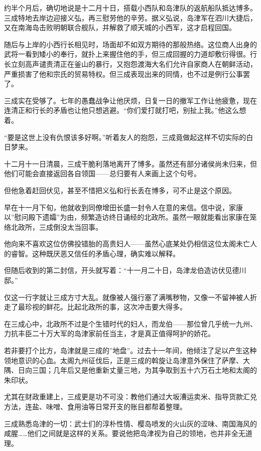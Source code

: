 \documentclass[
]{book}
\begin{document}
约半个月后，确切地说是十二月十日，搭载小西队和岛津队的返航船队抵达博多。三成特地去岸边迎接义弘，再三慰劳他的辛劳。据义弘说，岛津军在泗川大捷后，又在南海岛击败明朝联合舰队，并解救了顺天城的小西军，这才启程回国。

随后与上岸的小西行长相见时，场面却不如双方期待的那般热络。这位商人出身的武将一看到矮小的奉行，就扑上来握住他的手，但三成回握的力道却敷衍得很。行长立刻高声谴责清正在釜山的暴行，又抱怨渡海大名们允许自家商人在朝鲜活动，严重损害了他和宗氏的贸易特权。但三成表现出来的同情，也不过是例行公事罢了。

三成实在受够了。七年的愚蠢战争让他厌烦，日复一日的撤军工作让他疲惫，现在连清正和行长的矛盾也让他只想逃避。``你们爱打就打吧，别扯上我。''他这么想着。

``要是这世上没有仇恨该多好啊。''听着友人的抱怨，三成竟做起这样不切实际的白日梦来。

十二月十一日清晨，三成干脆利落地离开了博多。虽然还有部分诸侯尚未归来，但他们可能会直接返回各自领国------总归要有人来画上这个句号。

但他急着赶回伏见，甚至不惜把义弘和行长丢在博多，可不止是这个原因。

早在十一月下旬，他就收到同僚增田长盛一封令人在意的来信。信中说，家康以''慰问殿下遗孀''为由，频繁造访终日诵经的北政所。虽然一眼就能看出家康在笼络北政所，三成倒没太当回事。

他向来不喜欢这位仿佛投错胎的高贵妇人------虽然心底某处仍相信这位太阁未亡人的睿智。这种既厌恶又信任的矛盾心理，确实难以解释。

但随后收到的第二封信，开头就写着：``十一月二十日，岛津龙伯造访伏见德川邸。''

仅这一行字就让三成方寸大乱。就像被人强行塞了满嘴秽物，又像一不留神被人折走了最珍视的鲜花。比起北政所的事，这次冲击要大得多。

在三成心中，北政所不过是个生错时代的妇人，而龙伯------那位曾几乎统一九州、力抗丰臣二十万大军的岛津家前任当主，才是真正值得呵护的娇花。

若非要打个比方，岛津就是三成的''地盘''。过去十一年间，他倾注了足以产生这种领地意识的心血。太阁九州征伐后，正是三成的斡旋让岛津意外保住了萨摩、大隅、日向三国；几年后又是他重新丈量三地，为其争取到五十六万石土地和太阁的朱印状。

尤其在财政重建上，三成更是功不可没：教他们通过大坂漕运卖米、指导货款汇兑方法，连盐、味噌、食用油等日常开支的账目都帮着整理。

三成熟悉岛津的一切：武士们的淳朴性情、樱岛喷发的火山灰的涩味、南国海风的咸腥\ldots\ldots 他们之间就是这样的关系。要说他把岛津视为自己的领地，也并非全无道理。
\end{document}
